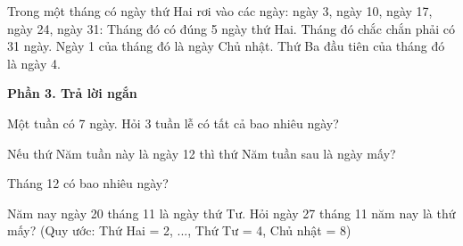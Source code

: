 \begin{ex} %
Trong một tháng có ngày thứ Hai rơi vào các ngày: ngày 3, ngày 10, ngày 17, ngày 24, ngày 31:
\choiceTF
{\True Tháng đó có đúng 5 ngày thứ Hai.}
{\True Tháng đó chắc chắn phải có 31 ngày.}
{Ngày 1 của tháng đó là ngày Chủ nhật.}
{\True Thứ Ba đầu tiên của tháng đó là ngày 4.}
\end{ex}

\textbf{Phần 3. Trả lời ngắn}

\begin{ex} %
Một tuần có 7 ngày. Hỏi 3 tuần lễ có tất cả bao nhiêu ngày?
\end{ex}

\begin{ex} %
Nếu thứ Năm tuần này là ngày 12 thì thứ Năm tuần sau là ngày mấy?
\end{ex}

\begin{ex} %
Tháng 12 có bao nhiêu ngày?
\end{ex}

\begin{ex} %
Năm nay ngày 20 tháng 11 là ngày thứ Tư. Hỏi ngày 27 tháng 11 năm nay là thứ mấy? (Quy ước: Thứ Hai = 2, ..., Thứ Tư = 4, Chủ nhật = 8)
\end{ex}

